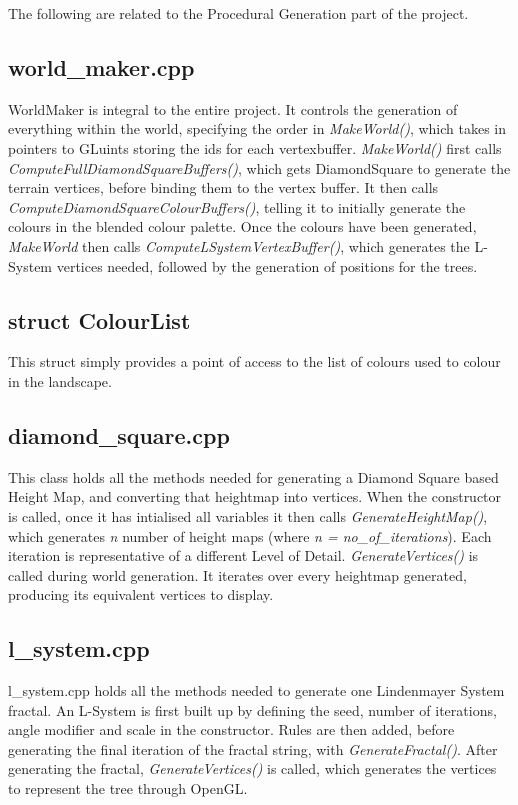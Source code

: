 \documentclass[a4paper,10pt]{report}
\begin{document}
The following are related to the Procedural Generation part of the project.

\subsection{world\_maker.cpp}
WorldMaker is integral to the entire project. It controls the generation of everything within the world, specifying the order in \textit{MakeWorld()}, which takes in pointers to GLuints storing the ids for each vertexbuffer. \textit{MakeWorld()} first calls \textit{ComputeFullDiamondSquareBuffers()}, which gets DiamondSquare to generate the terrain vertices, before binding them to the vertex buffer. It then calls \textit{ComputeDiamondSquareColourBuffers()}, telling it to initially generate the colours in the blended colour palette. Once the colours have been generated, \textit{MakeWorld} then calls \textit{ComputeLSystemVertexBuffer()}, which generates the L-System vertices needed, followed by the generation of positions for the trees.

\subsection{struct ColourList}
This struct simply provides a point of access to the list of colours used to colour in the landscape.

\subsection{diamond\_square.cpp}

This class holds all the methods needed for generating a Diamond Square based Height Map, and converting that heightmap into vertices. When the constructor is called, once it has intialised all variables it then calls \textit{GenerateHeightMap()}, which generates \textit{n} number of height maps (where \textit{n = no\_of\_iterations}). Each iteration is representative of a different Level of Detail. \textit{GenerateVertices()} is called during world generation. It iterates over every heightmap generated, producing its equivalent vertices to display. 

\subsection{l\_system.cpp}
l\_system.cpp holds all the methods needed to generate one Lindenmayer System fractal. An L-System is first built up by defining the seed, number of iterations, angle modifier and scale in the constructor. Rules are then added, before generating the final iteration of the fractal string, with \textit{GenerateFractal()}. After generating the fractal, \textit{GenerateVertices()} is called, which generates the vertices to represent the tree through OpenGL.
\end{document}
